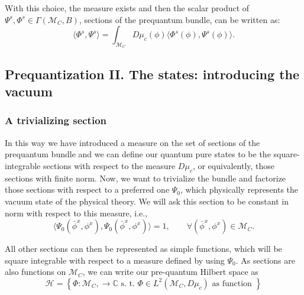 \documentclass[12pt]{article}%
\begin{document}
With this choice, the measure exists and then the scalar product of 
$\Psi^s,\Phi^s\in \Gamma(\mathcal{M}_C,B)$, sections of the prequantum bundle, can be written as:
\begin{equation}
\label{eq:scalarproductprequantum}
\langle\Phi^s,\Psi^s \rangle=\int_{\mathcal{M}_C}D\mu_c(\phi)\langle \Phi^s(\phi),\Psi^s(\phi)\rangle. 
\end{equation}

\subsection{Prequantization II. The states: introducing the vacuum}

\subsubsection{A trivializing section}
In this way we have introduced a measure on the set of sections of the prequantum bundle and we can define our quantum pure states to be the square-integrable sections with respect to the measure $D\mu_c$, or equivalently, those sections with finite norm. Now, we want to trivialize the bundle and factorize those sections with respect to a preferred one $\Psi_0$, which physically represents the vacuum state of the physical theory. We will ask this section to be constant in norm with respect to this measure, i.e.,
\begin{equation}
\label{eq:vacuum_norm}
\langle \Psi_0( \bar \phi^x, \phi^x), \Psi_0( \bar \phi^x, \phi^x) \rangle=1, \qquad \forall ( \bar \phi^x, \phi^x)\in \mathcal{M}_C.
\end{equation}

All other sections can then be represented as simple functions, which will be square integrable with respect to a measure defined by using $\Psi_0$. As sections are also functions on $\mathcal{M}_C$, we can write our pre-quantum Hilbert space as
\begin{equation}
\label{eq:preHilbert}
\mathcal{H}=\left \{ \Phi: \mathcal{M}_C, \to \mathbb{C} \text{ s. t. } \Phi\in L^2(\mathcal{M}_C,D\mu_c) \text{ as function } \right \}
\end{equation}
\end{document}
